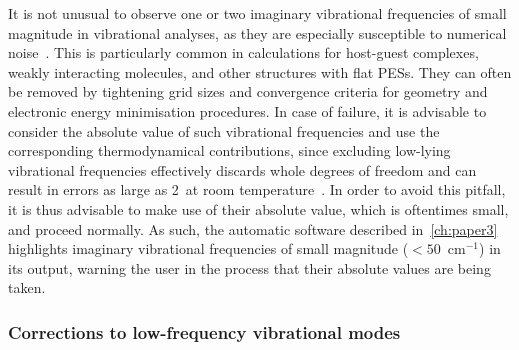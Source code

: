 It is not unusual to observe one or two imaginary vibrational frequencies of small magnitude in vibrational analyses,
as they are especially susceptible to numerical noise~\cite{Jensen_2015}.
This is particularly common in calculations for host-guest complexes,
weakly interacting molecules,
and other structures with flat PESs.
They can often be removed by tightening grid sizes and convergence criteria for geometry and electronic energy minimisation procedures.
In case of failure,
it is advisable to consider the absolute value of such vibrational frequencies and use the corresponding thermodynamical contributions,
since excluding low-lying vibrational frequencies effectively discards whole degrees of freedom and can result in errors as large as 2~\kcalmol at room temperature~\cite{Jensen_2015}.
In order to avoid this pitfall,
it is thus advisable to make use of their absolute value,
which is oftentimes small,
and proceed normally.
As such,
the automatic software described in~\cref{ch:paper3} highlights imaginary vibrational frequencies of small magnitude ($< 50$~cm$^{-1}$) in its output,
warning the user in the process that their absolute values are being taken.

\subsubsection{Corrections to low-frequency vibrational modes}%
\label{sec:quasi-rrho}

